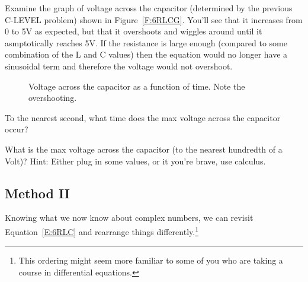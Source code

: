 Examine the graph of voltage across the capacitor (determined by the previous C-LEVEL problem) shown in Figure~\ref{F:6RLCG}. You'll see that it increases from 0 to 5V as expected, but that it overshoots and wiggles around until it asmptotically reaches 5V. If the resistance is large enough (compared to some combination of the L and C values) then the equation would no longer have a sinusoidal term and therefore the voltage would not overshoot.

\begin{figure}[H]
\begin{center}
\caption{Voltage across the capacitor as a function of time. Note the overshooting.}
\label{F:6RLCG3}
\end{center}
\end{figure}

\begin{alevel}
To the nearest second, what time does the max voltage across the capacitor occur?
\end{alevel}

\begin{clevel}
What is the max voltage across the capacitor (to the nearest hundredth of a Volt)? Hint: Either plug in some values, or it you're brave, use calculus.
\end{clevel}

\subsection{Method II}
Knowing what we now know about complex numbers, we can revisit Equation~\eqref{E:6RLC} and rearrange things differently.\footnote{This ordering might seem more familiar to some of you who are taking a course in differential equations.}

